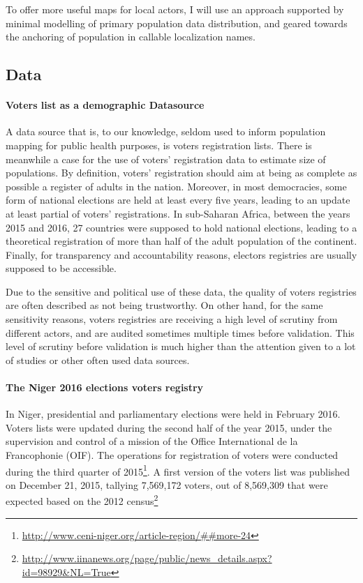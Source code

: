 To offer more useful maps for local actors, I will use an approach supported by minimal modelling of primary population data distribution, and geared towards the anchoring of population in callable localization names.

\subsection{Data}

\paragraph{Voters list as a demographic Datasource} A data source that is, to our knowledge, seldom used to inform population mapping for public health purposes, is voters registration lists. There is meanwhile a case for the use of voters' registration data to estimate size of populations. By definition, voters' registration should aim at being as complete as possible a register of adults in the nation. Moreover, in most democracies, some form of national elections are held at least  every five years, leading to an update at least partial of voters' registrations. In sub-Saharan Africa, between the years 2015 and 2016, 27 countries were supposed to hold national elections, leading to a theoretical registration of more than half of the adult population of the continent. Finally, for transparency and accountability reasons, electors registries are usually supposed to be accessible. \cite{spiegelhalter_handling_2005}

Due to the sensitive and political use of these data, the quality of voters registries are often described as not being trustworthy. On other hand, for the same sensitivity reasons, voters registries are receiving a high level of scrutiny from different actors, and are audited sometimes multiple times before validation. This level of scrutiny before validation is much higher than the attention given to a lot of studies or other often used data sources.

\paragraph{The Niger 2016 elections voters registry} In Niger, presidential and parliamentary elections were held in February 2016. Voters lists were updated during the second half of the year 2015, under the supervision and control of a mission of the Office International de la Francophonie (OIF). The operations for registration of voters were conducted during the third quarter of 2015\footnote{\url{http://www.ceni-niger.org/article-region/##more-24}}.
A first version of the voters list was published on December 21, 2015, tallying 7,569,172 voters, out of 8,569,309 that were expected based on the 2012 census\footnote{\url{http://www.iinanews.org/page/public/news_details.aspx?id=98929&NL=True}}

